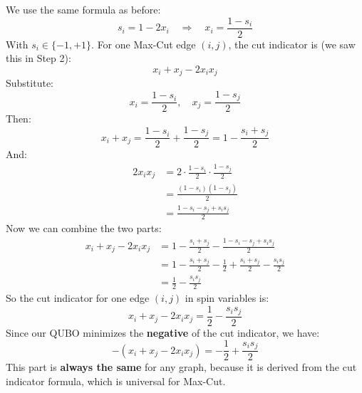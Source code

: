 \highspace
{} We use the same formula as before:
\begin{equation*}
    s_i = 1 - 2x_i \quad \Rightarrow \quad x_i = \frac{1 - s_i}{2}
\end{equation*}
With $s_i \in \{-1,+1\}$. For one Max-Cut edge $(i,j)$, the cut indicator is (we saw this in Step 2):
\begin{equation*}
    x_i + x_j - 2 x_i x_j
\end{equation*}
Substitute:
\begin{equation*}
    x_i = \frac{1 - s_i}{2}, \quad x_j = \frac{1 - s_j}{2}
\end{equation*}
Then:
\begin{equation*}
    x_i + x_j = \frac{1 - s_i}{2} + \frac{1 - s_j}{2} = 1 - \frac{s_i + s_j}{2}
\end{equation*}
And:
\begin{align*}
    2 x_i x_j &= 2 \cdot \frac{1 - s_i}{2} \cdot \frac{1 - s_j}{2} \\[.3em]
    &= \frac{(1 - s_i)(1 - s_j)}{2} \\[.3em]
    &= \frac{1 - s_i - s_j + s_i s_j}{2}
\end{align*}
Now we can combine the two parts:
\begin{align*}
    x_i + x_j - 2 x_i x_j &= 1 - \frac{s_i + s_j}{2} - \frac{1 - s_i - s_j + s_i s_j}{2} \\[.3em]
    &= 1 - \frac{s_i + s_j}{2} - \frac{1}{2} + \frac{s_i + s_j}{2} - \frac{s_i s_j}{2} \\[.3em]
    &= \frac{1}{2} - \frac{s_i s_j}{2}
\end{align*}
So the cut indicator for one edge $(i,j)$ in spin variables is:
\begin{equation*}
    x_i + x_j - 2 x_i x_j = \frac{1}{2} - \frac{s_i s_j}{2}
\end{equation*}
Since our QUBO minimizes the \textbf{negative} of the cut indicator, we have:
\begin{equation*}
    \boxed{-\left(x_i + x_j - 2 x_i x_j\right) = -\frac{1}{2} + \frac{s_i s_j}{2}}
\end{equation*}
\textcolor{Green3}{} This part is \textbf{always the same} for any graph, because it is derived from the cut indicator formula, which is universal for Max-Cut.

